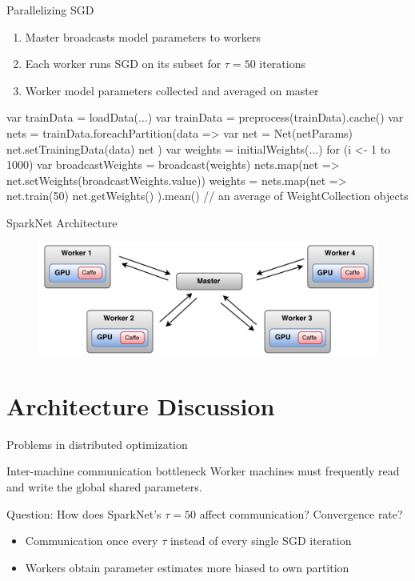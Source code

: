 \documentclass[pdf]{beamer}
\begin{document}
\begin{frame}[fragile]{Parallelizing SGD}
    \begin{enumerate}
        \item Master broadcasts model parameters to workers
        \item Each worker runs SGD on its subset for $\tau=50$ iterations
        \item Worker model parameters collected and averaged on master
    \end{enumerate}

    \begin{scalacode}
var trainData = loadData(...)
var trainData = preprocess(trainData).cache()
var nets = trainData.foreachPartition(data => {
    var net = Net(netParams)
    net.setTrainingData(data)
    net
})
var weights = initialWeights(...)
for (i <- 1 to 1000) {
    var broadcastWeights = broadcast(weights)
    nets.map(net => net.setWeights(broadcastWeights.value))
    weights = nets.map(net => {
        net.train(50)
        net.getWeights()
    }).mean() // an average of WeightCollection objects
}
    \end{scalacode}
\end{frame}


\begin{frame}{SparkNet Architecture}
\begin{figure}[htpb]
    \centering
    \includegraphics[width=0.8\linewidth]{Figures/arch.png}
\end{figure}
\end{frame}

\section{Architecture Discussion}

\begin{frame}{Problems in distributed optimization}
    \begin{block}{Inter-machine communication bottleneck}
        Worker machines must frequently read and write the global shared
        parameters.
    \end{block}


    \begin{alertblock}{Question: How does SparkNet's $\tau=50$ affect
        communication? Convergence rate?}
        \pause
        \begin{itemize}
            \item Communication once every $\tau$ instead of every single SGD iteration
            \item Workers obtain parameter estimates more biased to own partition
        \end{itemize}
    \end{alertblock}
\end{frame}
\end{document}
